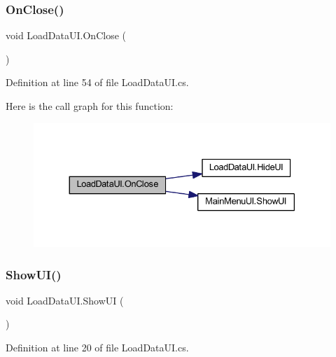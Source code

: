 \subsubsection{\texorpdfstring{OnClose()}{OnClose()}}
{\footnotesize\ttfamily void Load\+Data\+U\+I.\+On\+Close (\begin{DoxyParamCaption}{ }\end{DoxyParamCaption})}



Definition at line 54 of file Load\+Data\+U\+I.\+cs.

Here is the call graph for this function\+:
\nopagebreak
\begin{figure}[H]
\begin{center}
\leavevmode
\includegraphics[width=330pt]{class_load_data_u_i_a5d74ebc8dc0756974c13087df72872f0_cgraph}
\end{center}
\end{figure}
\mbox{\label{class_load_data_u_i_ac0ab99a18f93b2092d30e1ecea86154d}} 
\subsubsection{\texorpdfstring{ShowUI()}{ShowUI()}}
{\footnotesize\ttfamily void Load\+Data\+U\+I.\+Show\+UI (\begin{DoxyParamCaption}{ }\end{DoxyParamCaption})}



Definition at line 20 of file Load\+Data\+U\+I.\+cs.

